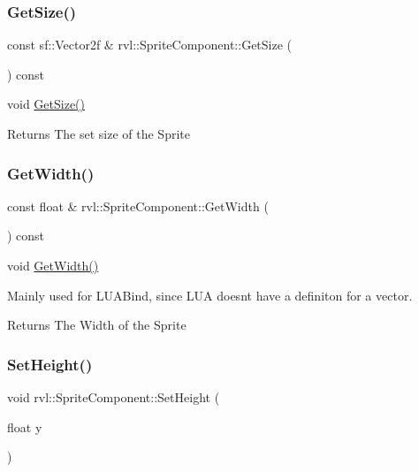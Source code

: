 \subsubsection{\texorpdfstring{Get\+Size()}{GetSize()}}
{\footnotesize\ttfamily const sf\+::\+Vector2f \& rvl\+::\+Sprite\+Component\+::\+Get\+Size (\begin{DoxyParamCaption}{ }\end{DoxyParamCaption}) const}



void \hyperlink{classrvl_1_1_sprite_component_a73f707ee88ac564b5a552b6605a2ae6f}{Get\+Size()} 

\begin{DoxyReturn}{Returns}
The set size of the Sprite 
\end{DoxyReturn}
\mbox{\label{classrvl_1_1_sprite_component_a6ec0d0b0cba06be74626bc633fa3e516}} 
\subsubsection{\texorpdfstring{Get\+Width()}{GetWidth()}}
{\footnotesize\ttfamily const float \& rvl\+::\+Sprite\+Component\+::\+Get\+Width (\begin{DoxyParamCaption}{ }\end{DoxyParamCaption}) const}



void \hyperlink{classrvl_1_1_sprite_component_a6ec0d0b0cba06be74626bc633fa3e516}{Get\+Width()} 

Mainly used for L\+U\+A\+Bind, since L\+UA doesn\textquotesingle{}t have a definiton for a vector.

\begin{DoxyReturn}{Returns}
The Width of the Sprite 
\end{DoxyReturn}
\mbox{\label{classrvl_1_1_sprite_component_a01adb38d3fcc3df48008794b3ae17865}} 
\subsubsection{\texorpdfstring{Set\+Height()}{SetHeight()}}
{\footnotesize\ttfamily void rvl\+::\+Sprite\+Component\+::\+Set\+Height (\begin{DoxyParamCaption}\item[{float}]{y }\end{DoxyParamCaption})}



